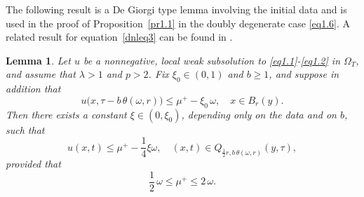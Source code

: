 \documentclass[a4paper,11pt,fullpage]{article}
\numberwithin{equation}{section}
\newtheorem{lemma}{Lemma}[section]
\begin{document}

The following result is a De Giorgi type lemma involving the initial data and is used in the proof of Proposition~\ref{pr1.1} in the doubly degenerate case \eqref{eq1.6}. A related result for equation~\eqref{dnleq3} can be found in \cite[Lemma~3.5]{BDLS23}.

\begin{lemma}\label{lem2.7}
Let $u$ be a nonnegative, local weak subsolution to \eqref{eq1.1}-\eqref{eq1.2} in $\Omega_T$, and assume that $\lambda>1$ and $p>2$. Fix $\xi_0\in (0, 1)$ and $b\geqslant 1$, and suppose in addition that
\begin{equation}\label{eq2.17}
u\big(x, \tau-b\,\theta(\omega,r)\big)\leqslant \mu^+- \xi_0\,\omega,\quad x\in B_r(y).
\end{equation}
Then there exists a constant $\xi\in(0,\xi_0)$, depending only on the data and on $b$, such that 
\begin{equation}\label{eq2.18}
u(x, t)\leqslant \mu^+- \frac{1}{4}\xi \omega,\quad (x, t)\in Q_{\frac{1}{2}r,b\,\theta(\omega,r)}(y, \tau),
\end{equation}
provided that
\begin{equation}\label{eq2.20}
\frac{1}{2}\,\omega \leqslant \mu^+\leqslant 2\,\omega.
\end{equation}
\end{lemma}

\end{document}
